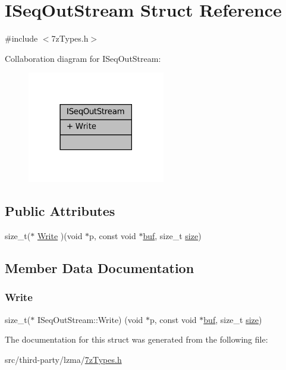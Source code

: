 \hypertarget{struct_i_seq_out_stream}{}\section{I\+Seq\+Out\+Stream Struct Reference}
\label{struct_i_seq_out_stream}


{\ttfamily \#include $<$7z\+Types.\+h$>$}



Collaboration diagram for I\+Seq\+Out\+Stream\+:
\nopagebreak
\begin{figure}[H]
\begin{center}
\leavevmode
\includegraphics[width=170pt]{struct_i_seq_out_stream__coll__graph}
\end{center}
\end{figure}
\subsection*{Public Attributes}
\begin{DoxyCompactItemize}
\item 
size\+\_\+t($\ast$ \mbox{\hyperlink{struct_i_seq_out_stream_ab3da610096fb1daa257f37577ad25065}{Write}} )(void $\ast$p, const void $\ast$\mbox{\hyperlink{ioapi_8h_a8ad8a13c88886b9f623034ff88570adb}{buf}}, size\+\_\+t \mbox{\hyperlink{ioapi_8h_a014d89bd76f74ef3a29c8f04b473eb76}{size}})
\end{DoxyCompactItemize}


\subsection{Member Data Documentation}
\mbox{\label{struct_i_seq_out_stream_ab3da610096fb1daa257f37577ad25065}} 
\subsubsection{\texorpdfstring{Write}{Write}}
{\footnotesize\ttfamily size\+\_\+t($\ast$ I\+Seq\+Out\+Stream\+::\+Write) (void $\ast$p, const void $\ast$\mbox{\hyperlink{ioapi_8h_a8ad8a13c88886b9f623034ff88570adb}{buf}}, size\+\_\+t \mbox{\hyperlink{ioapi_8h_a014d89bd76f74ef3a29c8f04b473eb76}{size}})}



The documentation for this struct was generated from the following file\+:\begin{DoxyCompactItemize}
\item 
src/third-\/party/lzma/\mbox{\hyperlink{7z_types_8h}{7z\+Types.\+h}}\end{DoxyCompactItemize}
